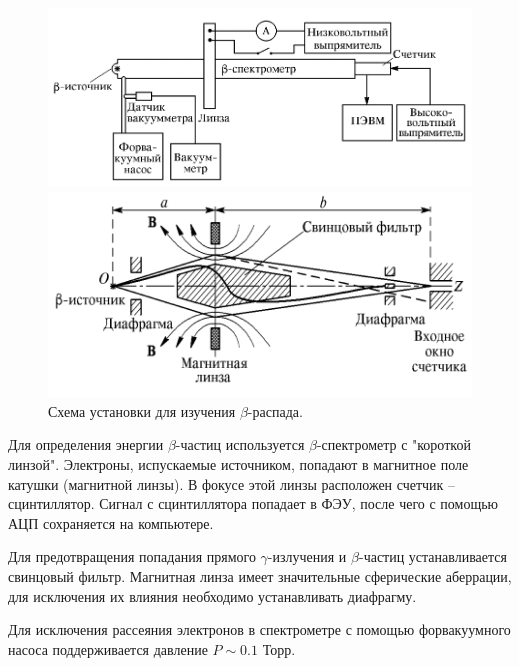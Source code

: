 \documentclass[a4paper, 12pt]{article} %
\begin{document}
	\begin{figure}[h!]
		\centering
		\begin{minipage}{0.5\textwidth}
			\centering
			\includegraphics[width=1.0\linewidth]{res/setup.png}
		\end{minipage}%
		\begin{minipage}{0.5\textwidth}
			\centering
			\includegraphics[width=1.0\linewidth]{res/scheme.png}
		\end{minipage}
		\caption{Схема установки для изучения $\beta$-распада.}
		\label{fig:setup_scheme}
	\end{figure}
	

	Для определения энергии $\beta$-частиц используется $\beta$-спектрометр с "короткой линзой". Электроны, испускаемые источником, попадают в магнитное поле катушки (магнитной линзы). В фокусе этой линзы расположен счетчик -- сцинтиллятор. Сигнал с сцинтиллятора попадает в ФЭУ, после чего с помощью АЦП сохраняется на компьютере.
	
	Для предотвращения попадания прямого $\gamma$-излучения и $\beta$-частиц устанавливается свинцовый фильтр. Магнитная линза имеет значительные сферические аберрации, для исключения их влияния необходимо устанавливать диафрагму.
	
	Для исключения рассеяния электронов в спектрометре с помощью форвакуумного насоса поддерживается давление $P \sim 0.1$ Торр.
	
\end{document}
